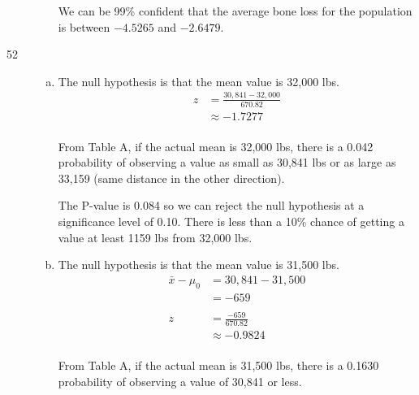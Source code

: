\documentclass[letterpaper, landscape]{exam}
\begin{document}
\begin{description}
\begin{enumerate}[(a)]
            We can be 99\% confident that the average bone loss for the
            population is between $-4.5265$ and $-2.6479$.

        \end{enumerate}

      \item[52]
        \begin{enumerate}[(a)]
          From exercise 50:
          \begin{align*}
            \bar{x}          & = 30,841 \\
            \sigma_{\bar{x}} & \approx 670.82 \\
          \end{align*}

          \item 
            The null hypothesis is that the mean value is 32,000 lbs.
            \begin{align*}
              z & = \frac{30,841 - 32,000}{670.82} \\
                & \approx -1.7277 \\
            \end{align*}

            From Table A, if the actual mean is 32,000 lbs, there is a 0.042
            probability of observing a value as small as 30,841 lbs or as large
            as 33,159 (same distance in the other direction).

            The P-value is 0.084 so we can reject the null hypothesis at a
            significance level of 0.10. There is less than a 10\% chance of
            getting a value at least 1159 lbs from 32,000 lbs.

          \item 
            The null hypothesis is that the mean value is 31,500 lbs.
            \begin{align*}
              \bar{x} - \mu_0 & = 30,841 - 31,500 \\
                              & = -659 \\
              \\
              z  & = \frac{-659}{670.82} \\
                 & \approx -0.9824 \\
            \end{align*}

            From Table A, if the actual mean is 31,500 lbs, there is a 0.1630
            probability of observing a value of 30,841 or less.


\end{enumerate}
\end{description}
\end{document}
